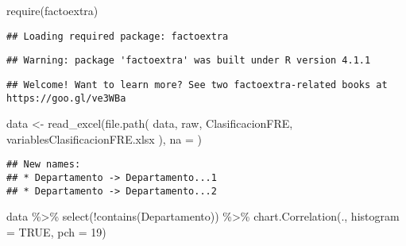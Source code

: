\documentclass[
]{article}
\newenvironment{Shaded}{\begin{snugshade}}{\end{snugshade}}
\newcommand{\AttributeTok}[1]{\textcolor[rgb]{0.77,0.63,0.00}{#1}}
\newcommand{\ConstantTok}[1]{\textcolor[rgb]{0.00,0.00,0.00}{#1}}
\newcommand{\DecValTok}[1]{\textcolor[rgb]{0.00,0.00,0.81}{#1}}
\newcommand{\FunctionTok}[1]{\textcolor[rgb]{0.00,0.00,0.00}{#1}}
\newcommand{\NormalTok}[1]{#1}
\newcommand{\OtherTok}[1]{\textcolor[rgb]{0.56,0.35,0.01}{#1}}
\newcommand{\SpecialCharTok}[1]{\textcolor[rgb]{0.00,0.00,0.00}{#1}}
\newcommand{\StringTok}[1]{\textcolor[rgb]{0.31,0.60,0.02}{#1}}
\begin{document}
\begin{Shaded}
\begin{Highlighting}[]
\FunctionTok{require}\NormalTok{(factoextra)}
\end{Highlighting}
\end{Shaded}

\begin{verbatim}
## Loading required package: factoextra
\end{verbatim}

\begin{verbatim}
## Warning: package 'factoextra' was built under R version 4.1.1
\end{verbatim}

\begin{verbatim}
## Welcome! Want to learn more? See two factoextra-related books at https://goo.gl/ve3WBa
\end{verbatim}

\begin{Shaded}
\begin{Highlighting}[]
\NormalTok{data }\OtherTok{\textless{}{-}}
  \FunctionTok{read\_excel}\NormalTok{(}\FunctionTok{file.path}\NormalTok{(}
    \StringTok{\textquotesingle{}data\textquotesingle{}}\NormalTok{,}
    \StringTok{\textquotesingle{}raw\textquotesingle{}}\NormalTok{,}
    \StringTok{\textquotesingle{}ClasificacionFRE\textquotesingle{}}\NormalTok{,}
    \StringTok{\textquotesingle{}variablesClasificacionFRE.xlsx\textquotesingle{}}
\NormalTok{  ), }\AttributeTok{na =} \StringTok{\textquotesingle{}{-}\textquotesingle{}}\NormalTok{)}
\end{Highlighting}
\end{Shaded}

\begin{verbatim}
## New names:
## * Departamento -> Departamento...1
## * Departamento -> Departamento...2
\end{verbatim}

\begin{Shaded}
\begin{Highlighting}[]
\NormalTok{data }\SpecialCharTok{\%\textgreater{}\%}
  \FunctionTok{select}\NormalTok{(}\SpecialCharTok{!}\FunctionTok{contains}\NormalTok{(}\StringTok{\textquotesingle{}Departamento\textquotesingle{}}\NormalTok{)) }\SpecialCharTok{\%\textgreater{}\%} 
  \FunctionTok{chart.Correlation}\NormalTok{(., }\AttributeTok{histogram =} \ConstantTok{TRUE}\NormalTok{, }\AttributeTok{pch =} \DecValTok{19}\NormalTok{)}
\end{Highlighting}
\end{Shaded}
\end{document}
